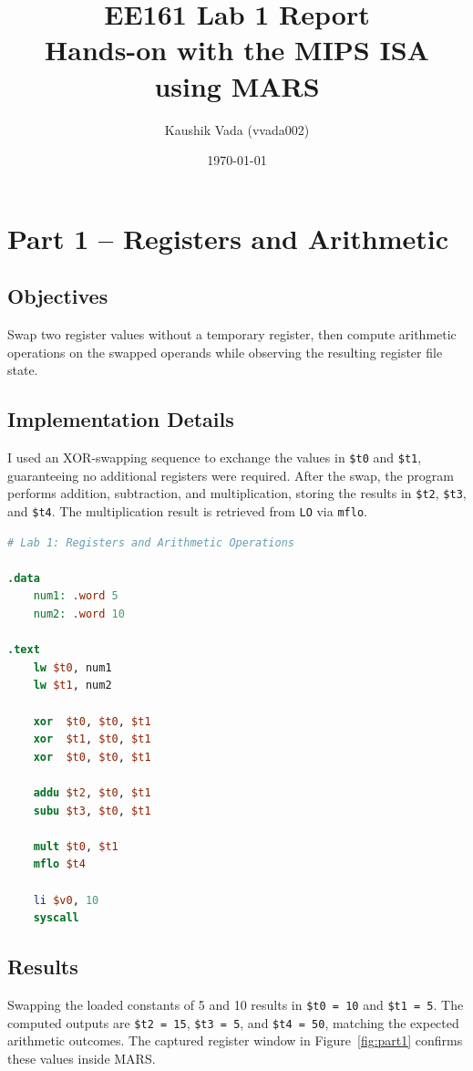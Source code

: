 \documentclass[11pt]{article}
\title{EE161 Lab 1 Report\\Hands-on with the MIPS ISA using MARS}
\author{Kaushik Vada (vvada002)}
\date{\today}
\begin{document}
\maketitle

\section{Part 1 -- Registers and Arithmetic}
\subsection*{Objectives}
Swap two register values without a temporary register, then compute arithmetic operations on the swapped operands while observing the resulting register file state.

\subsection*{Implementation Details}
I used an XOR-swapping sequence to exchange the values in \texttt{\$t0} and \texttt{\$t1}, guaranteeing no additional registers were required. After the swap, the program performs addition, subtraction, and multiplication, storing the results in \texttt{\$t2}, \texttt{\$t3}, and \texttt{\$t4}. The multiplication result is retrieved from \texttt{LO} via \texttt{mflo}.

\begin{lstlisting}[language=MIPS, caption={Part~1 solution (\texttt{part1\_Solution.asm})}, label=lst:part1]
# Lab 1: Registers and Arithmetic Operations

.data
    num1: .word 5
    num2: .word 10

.text
    lw $t0, num1
    lw $t1, num2

    xor  $t0, $t0, $t1
    xor  $t1, $t0, $t1
    xor  $t0, $t0, $t1

    addu $t2, $t0, $t1
    subu $t3, $t0, $t1

    mult $t0, $t1
    mflo $t4

    li $v0, 10
    syscall
\end{lstlisting}

\subsection*{Results}
Swapping the loaded constants of 5 and 10 results in \texttt{\$t0 = 10} and \texttt{\$t1 = 5}. The computed outputs are \texttt{\$t2 = 15}, \texttt{\$t3 = 5}, and \texttt{\$t4 = 50}, matching the expected arithmetic outcomes. The captured register window in Figure~\ref{fig:part1} confirms these values inside MARS.
\end{document}
